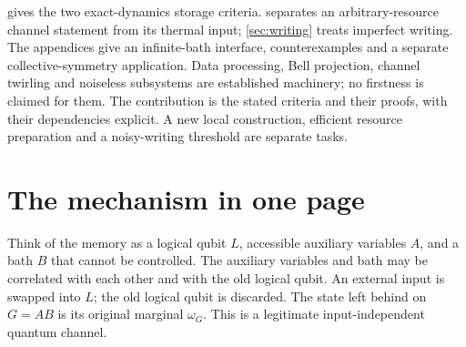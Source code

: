 \documentclass[11pt,reqno]{amsart}
\numberwithin{equation}{section}
\theoremstyle{definition}
\theoremstyle{remark}
\newcommand{\Tr}{\operatorname{Tr}}
\newcommand{\id}{\operatorname{id}}
\newcommand{\Ncal}{\mathcal N}
\newcommand{\diam}{d_\diamond}
\newcommand{\pa}{\mathfrak a}
\begin{document}
 gives the two exact-dynamics storage criteria.
 separates an arbitrary-resource channel statement from
its thermal input; \cref{sec:writing} treats imperfect writing.
The appendices give an infinite-bath interface, counterexamples and a
separate collective-symmetry application.
Data processing, Bell projection, channel twirling and noiseless
subsystems are established machinery; no firstness is claimed for them.
The contribution is the stated criteria and their proofs, with their
dependencies explicit. A new local construction, efficient resource
preparation and a noisy-writing threshold are separate tasks.

\clearpage
\section{The mechanism in one page}\label{sec:overview}

Think of the memory as a logical qubit \(L\), accessible auxiliary variables
\(A\), and a bath \(B\) that cannot be controlled. The auxiliary variables and
bath may be correlated with each other and with the old logical qubit.
An external input is swapped into \(L\); the old logical qubit is discarded.
The state left behind on \(G=A B\) is its original marginal \(\omega_G\).
This is a legitimate input-independent quantum channel.

\begin{center}
\end{center}
\end{document}
